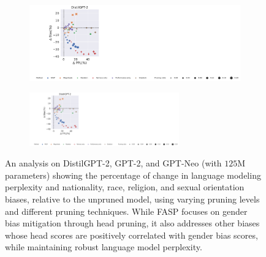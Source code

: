 \documentclass[letterpaper]{article} %
\newcommand{\goncalo}[1]
{\textcolor{orange}{{\bf}{\em #1}{\bf}}}
\begin{document}
\begin{figure}[!h]
      \begin{subfigure}
    \centering    \includegraphics[clip, trim=0cm 0.295cm 19cm 14.8cm, width=1.0\textwidth]{figures/camera_Ready_gender_bias_red_DistilGPT-2_gender_and_sex_legend.pdf}
     \end{subfigure}
    \begin{subfigure}
    \centering    \includegraphics[clip, trim=24.8cm 0.29cm 0.15cm 14.75cm, width=0.71\textwidth]{figures/camera_Ready_gender_bias_red_DistilGPT-2_gender_and_sex_legend.pdf}
     \end{subfigure}
   \caption{An analysis on DistilGPT-2, GPT-2, and GPT-Neo (with $125$M parameters) showing the percentage of change in language modeling perplexity and nationality, race, religion, and sexual orientation biases, relative to the unpruned model, using varying pruning levels and different pruning techniques. While FASP focuses on gender bias mitigation through head pruning, it also addresses other biases whose head scores are positively correlated with gender bias scores, while maintaining robust language model perplexity.
        }
        \label{fig:effect_on_ther_biases_gpt2}
\end{figure}

\end{document}
